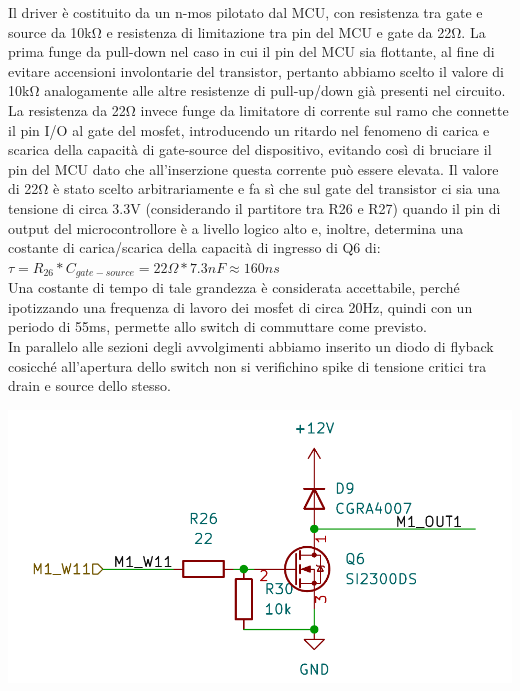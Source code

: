 \noindent Il driver è costituito da un n-mos pilotato dal MCU, con resistenza tra gate e source da 10kΩ 
e resistenza di limitazione tra pin del MCU e gate da 22Ω. 
La prima funge da pull-down nel caso in cui il pin
del MCU sia flottante, al fine di evitare accensioni involontarie del
transistor, pertanto abbiamo scelto il valore di 10kΩ analogamente alle
altre resistenze di pull-up/down già presenti nel circuito. La
resistenza da 22Ω invece funge da limitatore di corrente sul ramo che connette il pin I/O al
gate del mosfet, introducendo un ritardo nel fenomeno di carica e scarica
della capacità di gate-source del dispositivo, evitando così di bruciare
il pin del MCU dato che all'inserzione questa corrente può essere
elevata. Il valore di 22Ω è stato scelto arbitrariamente e fa sì che sul
gate del transistor ci sia una tensione di circa 3.3V (considerando il
partitore tra R26 e R27) quando il pin di output del microcontrollore è
a livello logico alto e, inoltre, determina una costante di
carica/scarica della capacità di ingresso di Q6 di:\\
\(\tau = R_{ 26} * C_{gate - source} = 22 \Omega * 7.3nF \approx 160ns\)\\
Una costante di tempo di tale grandezza è considerata accettabile,
perché ipotizzando una frequenza di lavoro dei mosfet di circa 20Hz,
quindi con un periodo di 55ms, permette allo switch di commuttare come
previsto.\\
In parallelo alle sezioni degli avvolgimenti abbiamo inserito un diodo di
flyback cosicché all'apertura dello switch non si verifichino spike di
tensione critici tra drain e source dello stesso.

\begin{center}
\includegraphics[scale=0.5]{figures/image63.png}
\captionsetup{type=figure}
\end{center}

